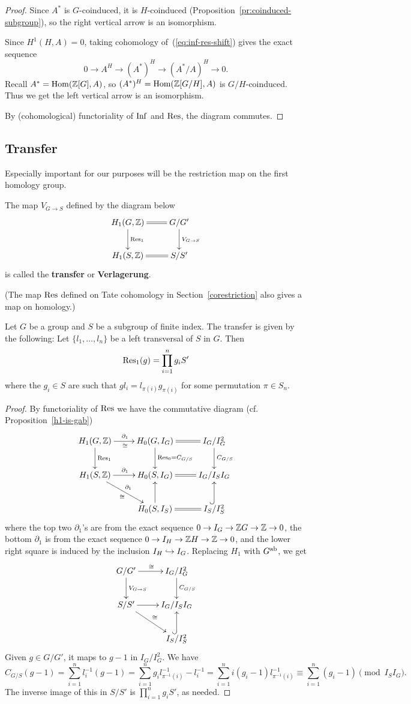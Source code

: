 \begin{proof}
Since $A^*$ is $G$-coinduced, it is $H$-coinduced (Proposition~\ref{pr:coinduced-subgroup}), so the right vertical arrow is an isomorphism.

Since $H^1(H,A)=0$, taking cohomology of~(\ref{eq:inf-res-shift}) gives the exact sequence
\[
0\to A^H\to (A^*)^H\to (A^*/A)^H\to 0.
\]
Recall $A^*=\operatorname{Hom}(\mathbb{Z}[G],A)$, so $(A^*)^H=\operatorname{Hom}(\mathbb{Z}[G/H],A)$ is $G/H$-coinduced. Thus we get the left vertical arrow is an isomorphism.

By (cohomological) functoriality of $\operatorname{Inf}$ and $\operatorname{Res}$, the diagram commutes.
\end{proof}
\subsection{Transfer}
Especially important for our purposes will be the restriction map on the first homology group.
\begin{df}
The map $V_{G\to S}$ defined by the diagram below
\[
\xymatrix{
H_1(G,\Z) \ar@{=}[r] \ar[d]^{\Res_1}& G/G'\ar[d]^{V_{G\to S}}\\
H_1(S,\Z) \ar@{=}[r] & S/S'
}
\]
is called the \textbf{transfer} or \textbf{Verlagerung}.
\end{df}
(The map $\operatorname{Res}$ defined on Tate cohomology in Section~\ref{corestriction} also gives a map on homology.)
\begin{pr}
Let $G$ be a group and $S$ be a subgroup of finite index. 
The transfer is given by the following: Let $\{l_1,\ldots,l_n\}$ be a left transversal of $S$ in $G$. Then
\[
\operatorname{Res}_1(g)=\prod_{i=1}^n g_i S'
\]
where the $g_i\in S$ are such that $gl_i=l_{\pi(i)}g_{\pi(i)}$ for some permutation $\pi\in S_n$.
\end{pr}
\begin{proof}
By functoriality of $\operatorname{Res}$ we have the commutative diagram (cf. Proposition~\ref{h1-is-gab})
\[
\xymatrix{
H_1(G,\Z)\ar[d]^{\Res_1}\ar[r]^{\partial_1}_{\cong} & H_0(G,I_G) \ar@{=}[r]\ar[d]^{\Res_0=C_{G/S}} & I_G/I_G^2\ar[d]^{C_{G/S}}\\
H_1(S,\Z)\ar[r]^{\partial_1}\ar[rd]^{\partial_1}_{\cong} & H_0(S,I_G)\ar@{=}[r] & I_G/I_SI_G\\
& H_0(S,I_S)\ar[u]\ar@{=}[r] & I_S/I_S^2\ar@{^(->}[u].
}
\]
where the top two $\partial_1$'s are from the exact sequence $0\to I_G\to \mathbb{Z} G\to \mathbb{Z}\to 0$, the bottom $\partial_1$ is from the exact sequence $0\to I_H \to \mathbb{Z} H\to \mathbb{Z} \to 0$, and the lower right square is induced by the inclusion $I_H\hookrightarrow I_G$. Replacing $H_1$ with $G^{\text{ab}}$, we get
\[
\xymatrix{
G/G'\ar[d]^{V_{G\to S}}\ar[r]^{\cong} & I_G/I_G^2\ar[d]^{C_{G/S}}\\
S/S'\ar[r]\ar[rd]^{\cong} & I_G/I_SI_G\\
& I_S/I_S^2\ar@{^(->}[u].
}
\]
Given $g\in G/G'$, it maps to $g-1$ in $I_G/I_G^2$. We have
\[
C_{G/S}(g-1)=\sum_{i=1}^n l_i^{-1}(g-1)=\sum_{i=1}^n g_il_{\pi^{-1}(i)}^{-1}-l_i^{-1}=\sum_{i=1}^ni (g_i-1)l_{\pi^{-1}(i)}^{-1}\equiv \sum_{i=1}^n (g_i-1)\pmod{I_SI_G}.
\]
The inverse image of this in $S/S'$ is $\prod_{i=1}^n g_iS'$, as needed.
\end{proof}
